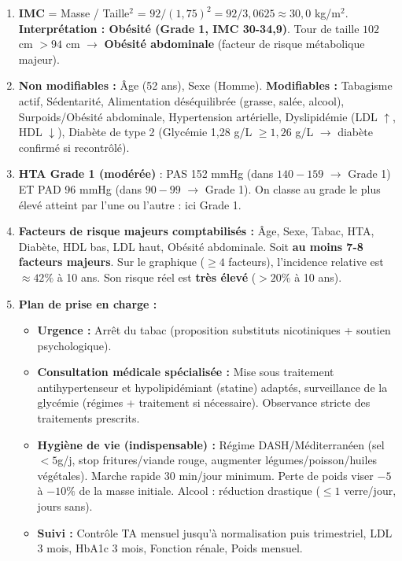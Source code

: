 \documentclass[11pt]{article}
\begin{document}
\begin{corrige}
\begin{enumerate}
    \item \textbf{IMC} = Masse / Taille$^2$ = $92 / (1{,}75)^2 = 92 / 3{,}0625 \approx 30{,}0$ kg/m$^2$. \textbf{Interprétation : Obésité (Grade 1, IMC 30-34,9)}. Tour de taille $102$ cm $> 94$ cm $\rightarrow$ \textbf{Obésité abdominale} (facteur de risque métabolique majeur).
    \item \textbf{Non modifiables :} Âge (52 ans), Sexe (Homme).
    \textbf{Modifiables :} Tabagisme actif, Sédentarité, Alimentation déséquilibrée (grasse, salée, alcool), Surpoids/Obésité abdominale, Hypertension artérielle, Dyslipidémie (LDL $\uparrow$, HDL $\downarrow$), Diabète de type 2 (Glycémie 1,28 g/L $\ge 1,26$ g/L $\rightarrow$ diabète confirmé si recontrôlé).
    \item \textbf{HTA Grade 1 (modérée)} : PAS 152 mmHg (dans $140-159$ $\rightarrow$ Grade 1) ET PAD 96 mmHg (dans $90-99$ $\rightarrow$ Grade 1). On classe au grade le plus élevé atteint par l'une ou l'autre : ici Grade 1.
    \item \textbf{Facteurs de risque majeurs comptabilisés :} Âge, Sexe, Tabac, HTA, Diabète, HDL bas, LDL haut, Obésité abdominale. Soit \textbf{au moins 7-8 facteurs majeurs}. Sur le graphique ($\ge 4$ facteurs), l'incidence relative est $\approx 42\%$ à 10 ans. Son risque réel est \textbf{très élevé} ($> 20\%$ à 10 ans).
    \item \textbf{Plan de prise en charge :}
    \begin{itemize}
        \item \textbf{Urgence :} Arrêt du tabac (proposition substituts nicotiniques + soutien psychologique).
        \item \textbf{Consultation médicale spécialisée :} Mise sous traitement antihypertenseur et hypolipidémiant (statine) adaptés, surveillance de la glycémie (régimes + traitement si nécessaire). Observance stricte des traitements prescrits.
        \item \textbf{Hygiène de vie (indispensable) :} Régime DASH/Méditerranéen (sel $< 5$g/j, stop fritures/viande rouge, augmenter légumes/poisson/huiles végétales). Marche rapide 30 min/jour minimum. Perte de poids viser $-5$ à $-10\%$ de la masse initiale. Alcool : réduction drastique ($\le 1$ verre/jour, jours sans).
        \item \textbf{Suivi :} Contrôle TA mensuel jusqu'à normalisation puis trimestriel, LDL 3 mois, HbA1c 3 mois, Fonction rénale, Poids mensuel.
    \end{itemize}
\end{enumerate}
\end{corrige}
\end{document}

